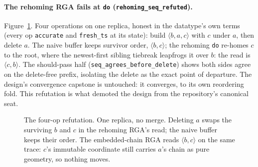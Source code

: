 \documentclass[11pt]{article}
\newcommand{\code}[1]{\texttt{#1}}
\newcommand{\del}{\mathsf{del}}
\begin{document}
\paragraph{The rehoming RGA fails at \code{do}
(\code{rehoming\_seq\_refuted}).}
Figure~\ref{fig:refutation}. Four operations on one replica, honest in
the datatype's own terms (every op \code{accurate} and
\code{fresh\_ts} at its state): build $\langle b, a, c\rangle$ with
$c$ under $a$, then delete $a$. The naive buffer keeps survivor order,
$\langle b, c\rangle$; the rehoming \code{do} re-homes $c$ to the
root, where the newest-first sibling tiebreak leapfrogs it over $b$:
the read is $\langle c, b\rangle$. The should-pass half
(\code{seq\_agrees\_before\_delete}) shows both sides agree on the
delete-free prefix, isolating the delete as the exact point of
departure. The design's convergence capstone is untouched: it
converges, to its own reordering fold. This refutation is what demoted
the design from the repository's canonical seat.

\begin{figure}[h]
\centering
{}
\caption{The four-op refutation. One replica, no merge. Deleting $a$
swaps the surviving $b$ and $c$ in the rehoming RGA's read; the naive
buffer keeps their order. The embedded-chain RGA reads
$\langle b, c\rangle$ on the same trace: $c$'s immutable coordinate
still carries $a$'s chain as pure geometry, so nothing moves.}
\label{fig:refutation}
\end{figure}
\end{document}
